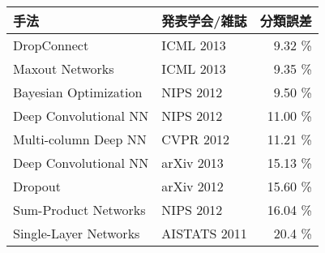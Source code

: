   \begin{tabular}{|l|l|r|}\hline
  手法 & 発表学会/雑誌 & 分類誤差 \\ \hline
DropConnect \cite{wan2013regularization}& ICML 2013 & 9.32 \% \\ \hline
Maxout Networks \cite{goodfellow2013maxout}& ICML 2013 & 9.35 \% \\ \hline
Bayesian Optimization \cite{snoek2012practical}& NIPS 2012 & 9.50 \% \\ \hline
Deep Convolutional NN \cite{krizhevsky2012imagenet}& NIPS 2012 & 11.00 \% \\ \hline
Multi-column Deep NN \cite{ciresan2012multi-column}& CVPR 2012 & 11.21 \% \\ \hline
Deep Convolutional NN \cite{zeiler2013stochastic}& arXiv 2013 & 15.13 \% \\ \hline
Dropout \cite{hinton2012improving}& arXiv 2012 & 15.60 \% \\ \hline
Sum-Product Networks \cite{gens2012discriminative}& NIPS 2012 & 16.04 \% \\ \hline
Single-Layer Networks \cite{coates2011an-analysis}& AISTATS 2011 & 20.4 \% \\ \hline
  \end{tabular}
